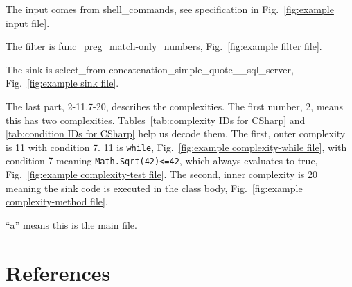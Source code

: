 \noindent The input comes from shell\_commands, see specification in
Fig.~\ref{fig:example input file}.

\noindent The filter is func\_preg\_match-only\_numbers,
Fig.~\ref{fig:example filter file}.

\noindent The sink is select\_from-concatenation\_simple\_quote\_\_sql\_server,
Fig.~\ref{fig:example sink file}.

\noindent The last part, 2-11.7-20, describes the complexities.
The first number, 2, means this has two complexities.
Tables~\ref{tab:complexity IDs for CSharp} and
\ref{tab:condition IDs for CSharp} help us decode them.
The first, outer complexity is 11 with condition 7. 11 is \verb|while|,
Fig.~\ref{fig:example complexity-while file}, 
with condition 7 meaning \verb|Math.Sqrt(42)<=42|, which always evaluates to true,
Fig.~\ref{fig:example complexity-test file}.
The second, inner complexity is 20 meaning the sink code is executed in the class body,
Fig.~\ref{fig:example complexity-method file}.

\noindent ``a'' means this is the main file.



\section*{References}



%
%

